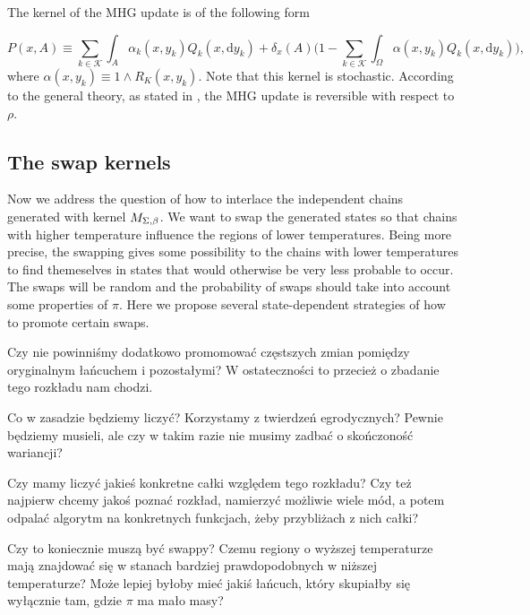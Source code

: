 	The kernel of the MHG update is of the following form
	
	$$P(x,A) \equiv \underset{k \in \mathcal{K}}{\sum} \int_A \alpha_k (x,y_k) Q_k(x, \mathrm{d }y_k) + \delta_x (A) \Big(1 - \underset{k \in \mathcal{K}}{\sum} \int_{\Omega} \alpha(x,y_k) Q_k(x,\mathrm{d }y_k) \Big), $$
	where $\alpha(x,y_k) \equiv 1\wedge R_K (x,y_k)$. Note that this kernel is stochastic. According to the general theory, as stated in \cite{CharlesJ.Geyer}, the MHG update is reversible with respect to $\rho$. 

\subsection*{The swap kernels}

	Now we address the question of how to interlace the independent chains generated with kernel $M_{\Sigma,\beta}$. We want to swap the generated states so that chains with higher temperature influence the regions of lower temperatures. Being more precise, the swapping gives some possibility to the chains with lower temperatures to find themeselves in states that would otherwise be very less probable to occur. The swaps will be random and the probability of swaps should take into account some properties of $\pi$. Here we propose several state-dependent strategies of how to promote certain swaps.
	
\begin{questions}[resume]
	\item Czy nie powinniśmy dodatkowo promomować częstszych zmian pomiędzy oryginalnym łańcuchem i pozostałymi? W ostateczności to przecież o zbadanie tego rozkładu nam chodzi. 

	\item Co w zasadzie będziemy liczyć? Korzystamy z twierdzeń egrodycznych? Pewnie będziemy musieli, ale czy w takim razie nie musimy zadbać o skończoność wariancji?

	\item Czy mamy liczyć jakieś konkretne całki względem tego rozkładu? Czy też najpierw chcemy jakoś poznać rozkład, namierzyć możliwie wiele mód, a potem odpalać algorytm na konkretnych funkcjach, żeby przybliżach z nich całki?

	\item Czy to koniecznie muszą być swappy? Czemu regiony o wyższej temperaturze mają znajdować się w stanach bardziej prawdopodobnych w niższej temperaturze? Może lepiej byłoby mieć jakiś łańcuch, który skupiałby się wyłącznie tam, gdzie $\pi$ ma mało masy? 
\end{questions}

